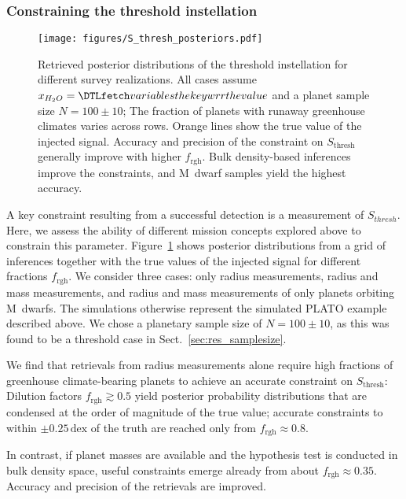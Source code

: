 \documentclass[twocolumn]{aastex631}
\begin{document}
\subsubsection{Constraining the threshold instellation}\label{sec:res_constrain-S_thresh}
\begin{figure}[ht!]
    \begin{centering}
        \texttt{[image: figures/S\_thresh\_posteriors.pdf]}
        \caption{
            Retrieved posterior distributions of the threshold instellation for different survey realizations.
            All cases assume $x_{H_2O} = \var{wrr}$ and a planet sample size $N=100\pm10$; The fraction of planets with runaway greenhouse climates varies across rows.
            Orange lines show the true value of the injected signal.
            Accuracy and precision of the constraint on $S_\mathrm{thresh}$ generally improve with higher $f_\mathrm{rgh}$.
            Bulk density-based inferences improve the constraints, and M~dwarf samples yield the highest accuracy.
        }
        \label{fig:posterior_surveys}
    \end{centering}
\end{figure}
A key constraint resulting from a successful detection is a measurement of $S_{thresh}$.
Here, we assess the ability of different mission concepts explored above to constrain this parameter.
Figure~\ref{fig:posterior_surveys} shows posterior distributions from a grid of inferences together with the true values of the injected signal for different fractions $f_\mathrm{rgh}$.
We consider three cases: only radius measurements, radius and mass measurements, and radius and mass measurements of only planets orbiting M~dwarfs.
The simulations otherwise represent the simulated PLATO example described above.
We chose a planetary sample size of $N=100\pm10$, as this was found to be a threshold case in Sect.~\ref{sec:res_samplesize}.

We find that retrievals from radius measurements alone require high fractions of greenhouse climate-bearing planets to achieve an accurate constraint on $S_\mathrm{thresh}$:
Dilution factors $f_\mathrm{rgh} \gtrsim 0.5$ yield posterior probability distributions that are condensed at the order of magnitude of the true value; accurate constraints to within $\pm 0.25\,\mathrm{dex}$ of the truth are reached only from $f_\mathrm{rgh} \approx 0.8$.

In contrast, if planet masses are available and the hypothesis test is conducted in bulk density space, useful constraints emerge already from about $f_\mathrm{rgh} \approx 0.35$.
Accuracy and precision of the retrievals are improved.
\end{document}
